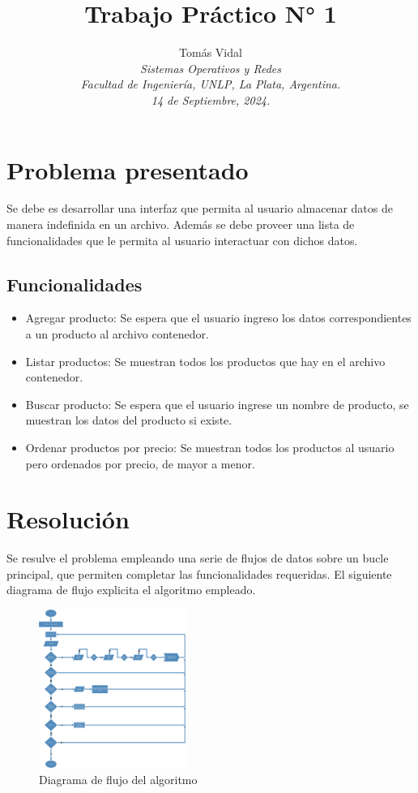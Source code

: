\documentclass[letterpaper, 10 pt, conference]{ieeeconf}  %
\title{\LARGE \bf Trabajo Práctico N° 1}
\author{
  Tom\'as Vidal\\
  {\it Sistemas Operativos y Redes}\\
  {\it Facultad de Ingenier\'ia, UNLP, La Plata, Argentina.}\\
  {\it 14 de Septiembre, 2024.}
}                                            %
\begin{document}
\maketitle
\thispagestyle{empty}
\pagestyle{empty}

\section{Problema presentado}
Se debe es desarrollar una interfaz que permita al usuario almacenar datos de manera indefinida en un archivo. Además se debe proveer una lista de funcionalidades que le permita al usuario interactuar con dichos datos.

\subsection{Funcionalidades}
\begin{itemize}
  \item Agregar producto: Se espera que el usuario ingreso los datos correspondientes a un producto al archivo contenedor.
  \item Listar productos: Se muestran todos los productos que hay en el archivo contenedor.
  \item Buscar producto: Se espera que el usuario ingrese un nombre de producto, se muestran los datos del producto si existe.
  \item Ordenar productos por precio: Se muestran todos los productos al usuario pero ordenados por precio, de mayor a menor.
\end{itemize}

\section{Resolución}
Se resulve el problema empleando una serie de flujos de datos sobre un bucle principal, que permiten completar las funcionalidades requeridas. El siguiente diagrama de flujo explicita el algoritmo empleado.
\begin{figure}[H]
  \centering
  \includegraphics[width=0.43\textwidth]{./diagrama_flujo_tp1.png}
  \caption{Diagrama de flujo del algoritmo}
  \label{img:diag_flujo}
\end{figure}
\end{document}
